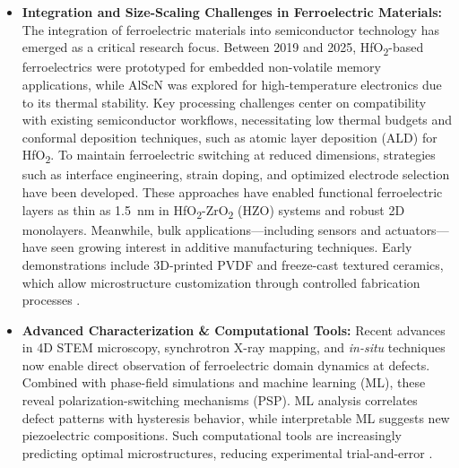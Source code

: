 \documentclass[a4paper,fleqn]{cas-sc}
\begin{document}
\begin{itemize}
    \item \textbf{Integration and Size-Scaling Challenges in Ferroelectric Materials:} The integration of ferroelectric materials into semiconductor technology has emerged as a critical research focus. Between 2019 and 2025, HfO\textsubscript{2}-based ferroelectrics were prototyped for embedded non-volatile memory applications, while AlScN was explored for high-temperature electronics due to its thermal stability. Key processing challenges center on compatibility with existing semiconductor workflows, necessitating low thermal budgets and conformal deposition techniques, such as atomic layer deposition (ALD) for HfO\textsubscript{2}. To maintain ferroelectric switching at reduced dimensions, strategies such as interface engineering, strain doping, and optimized electrode selection have been developed. These approaches have enabled functional ferroelectric layers as thin as 1.5\, nm in HfO\textsubscript{2}-ZrO\textsubscript{2} (HZO) systems and robust 2D monolayers. Meanwhile, bulk applications—including sensors and actuators—have seen growing interest in additive manufacturing techniques. Early demonstrations include 3D-printed PVDF and freeze-cast textured ceramics, which allow microstructure customization through controlled fabrication processes \cite{zhang2024new,shi2023interface,cho2024atomic}.
    
    \item \textbf{Advanced Characterization \& Computational Tools:} Recent advances in 4D STEM microscopy, synchrotron X-ray mapping, and \textit{in-situ} techniques now enable direct observation of ferroelectric domain dynamics at defects. Combined with phase-field simulations and machine learning (ML), these reveal polarization-switching mechanisms (PSP). ML analysis correlates  defect patterns with hysteresis behavior, while interpretable ML suggests new piezoelectric compositions. Such computational tools are increasingly predicting optimal microstructures, reducing experimental trial-and-error \cite{zhu2025ultrahigh,alhada2025elucidating,tan2015unfolding,zhang2024new}.
    

\end{itemize}
\end{document}
